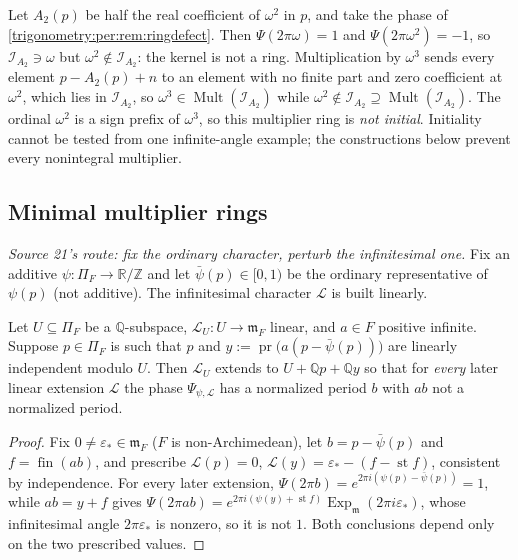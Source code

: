 \documentclass[11pt,letterpaper]{article}
\numberwithin{equation}{section}
\theoremstyle{definition}
\theoremstyle{remark}
\newcommand{\R}{\mathbb R}
\newcommand{\Q}{\mathbb Q}
\newcommand{\Z}{\mathbb Z}
\newcommand{\mm}{\mathfrak m}
\newcommand{\eps}{\varepsilon}
\newcommand{\st}{\operatorname{st}}
\newcommand{\fin}{\operatorname{fin}}
\newcommand{\Ex}{\operatorname{Exp}_{\mm}}
\newcommand{\Mult}{\operatorname{Mult}}
\newcommand{\pr}{\operatorname{pr}}
\newcommand{\cI}{\mathcal I}
\newcommand{\cL}{\mathcal L}
\begin{document}
\begin{example}
\label{trigonometry:per:ex:noninitial}
Let $A_2(p)$ be half the real coefficient of $\omega^2$ in $p$, and take the phase of
\cref{trigonometry:per:rem:ringdefect}. Then $\Psi(2\pi\omega)=1$ and $\Psi(2\pi\omega^2)=-1$, so
$\cI_{A_2}\ni\omega$ but $\omega^2\notin\cI_{A_2}$: the kernel is not a ring. Multiplication by
$\omega^3$ sends every element $p-A_2(p)+n$ to an element with no finite part and zero coefficient at
$\omega^2$, which lies in $\cI_{A_2}$, so $\omega^3\in\Mult(\cI_{A_2})$ while $\omega^2\notin
\cI_{A_2}\supseteq\Mult(\cI_{A_2})$. The ordinal $\omega^2$ is a sign prefix of $\omega^3$, so this
multiplier ring is \emph{not initial}. Initiality cannot be tested from one infinite-angle example;
the constructions below prevent every nonintegral multiplier.
\end{example}

\subsection{Minimal multiplier rings}\label{trigonometry:per:sec:minimal}
\emph{Source 21's route: fix the ordinary character, perturb the infinitesimal one.} Fix an additive
$\psi:\Pi_F\to\R/\Z$ and let $\bar\psi(p)\in[0,1)$ be the ordinary representative of $\psi(p)$ (not
additive). The infinitesimal character $\cL$ is built linearly.

\begin{lemma}\label{trigonometry:per:lem:onestep}
Let $U\subseteq\Pi_F$ be a $\Q$-subspace, $\cL_U:U\to\mm_F$ linear, and $a\in F$ positive infinite.
Suppose $p\in\Pi_F$ is such that $p$ and $y:=\pr\bigl(a(p-\bar\psi(p))\bigr)$ are linearly
independent modulo $U$. Then $\cL_U$ extends to $U+\Q p+\Q y$ so that for \emph{every} later linear
extension $\cL$ the phase $\Psi_{\psi,\cL}$ has a normalized period $b$ with $ab$ not a normalized
period.
\end{lemma}
\begin{proof}
Fix $0\ne\eps_*\in\mm_F$ ($F$ is non-Archimedean), let $b=p-\bar\psi(p)$ and $f=\fin(ab)$, and
prescribe $\cL(p)=0$, $\cL(y)=\eps_*-(f-\st f)$, consistent by independence. For every later
extension, $\Psi(2\pi b)=e^{2\pi i(\psi(p)-\bar\psi(p))}=1$, while $ab=y+f$ gives
$\Psi(2\pi ab)=e^{2\pi i(\psi(y)+\st f)}\Ex(2\pi i\eps_*)$, whose infinitesimal angle $2\pi\eps_*$ is
nonzero, so it is not $1$. Both conclusions depend only on the two prescribed values.
\end{proof}
\end{document}
